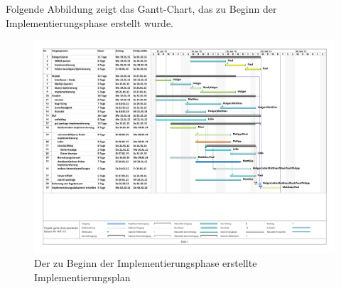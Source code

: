 Folgende Abbildung zeigt das Gantt-Chart, das zu Beginn der Implementierungsphase erstellt wurde.

\begin{figure}[H]
	\centering
	\includegraphics[width=\textwidth]{../Gantt/Implementierungsplan.pdf}
	\caption{Der zu Beginn der Implementierungsphase erstellte Implementierungsplan}
\end{figure}

